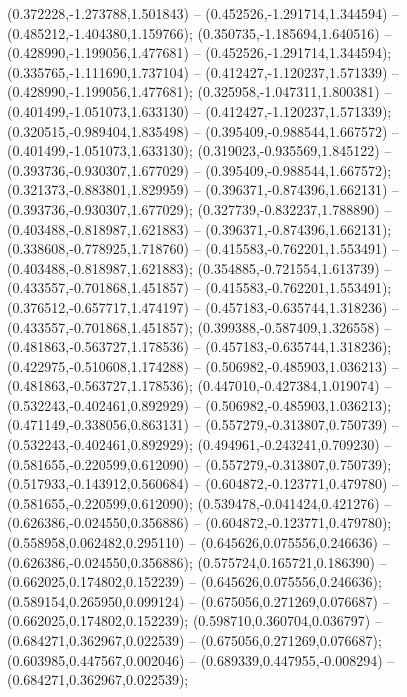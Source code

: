  (0.372228,-1.273788,1.501843) -- (0.452526,-1.291714,1.344594) -- (0.485212,-1.404380,1.159766);
 (0.350735,-1.185694,1.640516) -- (0.428990,-1.199056,1.477681) -- (0.452526,-1.291714,1.344594);
 (0.335765,-1.111690,1.737104) -- (0.412427,-1.120237,1.571339) -- (0.428990,-1.199056,1.477681);
 (0.325958,-1.047311,1.800381) -- (0.401499,-1.051073,1.633130) -- (0.412427,-1.120237,1.571339);
 (0.320515,-0.989404,1.835498) -- (0.395409,-0.988544,1.667572) -- (0.401499,-1.051073,1.633130);
 (0.319023,-0.935569,1.845122) -- (0.393736,-0.930307,1.677029) -- (0.395409,-0.988544,1.667572);
 (0.321373,-0.883801,1.829959) -- (0.396371,-0.874396,1.662131) -- (0.393736,-0.930307,1.677029);
 (0.327739,-0.832237,1.788890) -- (0.403488,-0.818987,1.621883) -- (0.396371,-0.874396,1.662131);
 (0.338608,-0.778925,1.718760) -- (0.415583,-0.762201,1.553491) -- (0.403488,-0.818987,1.621883);
 (0.354885,-0.721554,1.613739) -- (0.433557,-0.701868,1.451857) -- (0.415583,-0.762201,1.553491);
 (0.376512,-0.657717,1.474197) -- (0.457183,-0.635744,1.318236) -- (0.433557,-0.701868,1.451857);
 (0.399388,-0.587409,1.326558) -- (0.481863,-0.563727,1.178536) -- (0.457183,-0.635744,1.318236);
 (0.422975,-0.510608,1.174288) -- (0.506982,-0.485903,1.036213) -- (0.481863,-0.563727,1.178536);
 (0.447010,-0.427384,1.019074) -- (0.532243,-0.402461,0.892929) -- (0.506982,-0.485903,1.036213);
 (0.471149,-0.338056,0.863131) -- (0.557279,-0.313807,0.750739) -- (0.532243,-0.402461,0.892929);
 (0.494961,-0.243241,0.709230) -- (0.581655,-0.220599,0.612090) -- (0.557279,-0.313807,0.750739);
 (0.517933,-0.143912,0.560684) -- (0.604872,-0.123771,0.479780) -- (0.581655,-0.220599,0.612090);
 (0.539478,-0.041424,0.421276) -- (0.626386,-0.024550,0.356886) -- (0.604872,-0.123771,0.479780);
 (0.558958,0.062482,0.295110) -- (0.645626,0.075556,0.246636) -- (0.626386,-0.024550,0.356886);
 (0.575724,0.165721,0.186390) -- (0.662025,0.174802,0.152239) -- (0.645626,0.075556,0.246636);
 (0.589154,0.265950,0.099124) -- (0.675056,0.271269,0.076687) -- (0.662025,0.174802,0.152239);
 (0.598710,0.360704,0.036797) -- (0.684271,0.362967,0.022539) -- (0.675056,0.271269,0.076687);
 (0.603985,0.447567,0.002046) -- (0.689339,0.447955,-0.008294) -- (0.684271,0.362967,0.022539);
